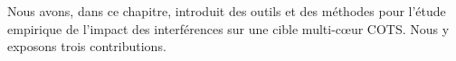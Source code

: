 








Nous avons, dans ce chapitre, introduit des outils et des méthodes pour l'étude empirique de l'impact des interférences sur une cible multi-cœur COTS.
Nous y exposons trois contributions.

